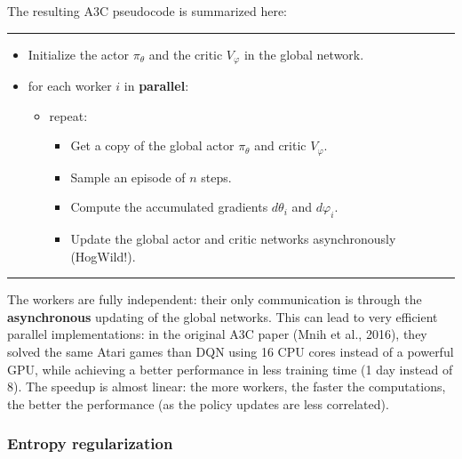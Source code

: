 \documentclass[
  letterpaper,
  DIV=11,
  numbers=noendperiod]{scrreprt}
\providecommand{\tightlist}{%
  \setlength{\itemsep}{0pt}\setlength{\parskip}{0pt}}\usepackage{longtable,booktabs,array}
\begin{document}
The resulting A3C pseudocode is summarized here:

\begin{center}\rule{0.5\linewidth}{0.5pt}\end{center}

\begin{itemize}
\item
  Initialize the actor \(\pi_\theta\) and the critic \(V_\varphi\) in
  the global network.
\item
  for each worker \(i\) in \textbf{parallel}:

  \begin{itemize}
  \tightlist
  \item
    repeat:

    \begin{itemize}
    \tightlist
    \item
      Get a copy of the global actor \(\pi_\theta\) and critic
      \(V_\varphi\).
    \item
      Sample an episode of \(n\) steps.
    \item
      Compute the accumulated gradients \(d\theta_i\) and
      \(d\varphi_i\).
    \item
      Update the global actor and critic networks asynchronously
      (HogWild!).
    \end{itemize}
  \end{itemize}
\end{itemize}

\begin{center}\rule{0.5\linewidth}{0.5pt}\end{center}

The workers are fully independent: their only communication is through
the \textbf{asynchronous} updating of the global networks. This can lead
to very efficient parallel implementations: in the original A3C paper
(Mnih et al., 2016), they solved the same Atari games than DQN using 16
CPU cores instead of a powerful GPU, while achieving a better
performance in less training time (1 day instead of 8). The speedup is
almost linear: the more workers, the faster the computations, the better
the performance (as the policy updates are less correlated).

\hypertarget{entropy-regularization}{%
\subsubsection*{Entropy regularization}\label{entropy-regularization}}
\end{document}
